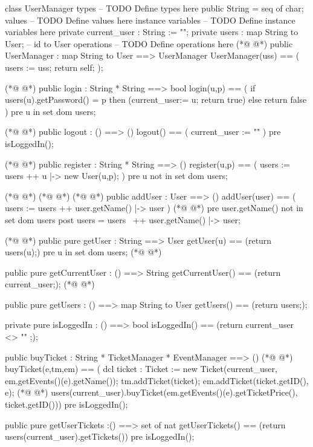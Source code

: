 \begin{vdmpp}[breaklines=true]
class UserManager
types
-- TODO Define types here
 public String = seq of char;
values
-- TODO Define values here
instance variables
-- TODO Define instance variables here
  private current_user : String := "";
 private users : map String to User; -- id to User
operations
-- TODO Define operations here
(*@
\label{UserManager:13}
@*)
 public UserManager : map String to User ==> UserManager
 UserManager(uss) == (
  users := uss;
  return self;
 );
 
(*@
\label{login:19}
@*)
 public login : String * String ==> bool
 login(u,p) == (
  if users(u).getPassword() = p
  then (current_user:= u; return true)
  else return false
 )
 pre u in set dom users;
 
(*@
\label{logout:27}
@*)
 public logout : () ==> ()
 logout() == (
  current_user := ""
 )
 pre isLoggedIn();
 
(*@
\label{register:33}
@*)
 public register : String * String ==> ()
 register(u,p) == (
  users := users ++ {u |-> new User(u,p)};
 )
 pre u not in set dom users;
 
(*@
\label{addEvent:39}
@*)
(*@
\label{getUser:39}
@*)
(*@
\label{addUser:39}
@*)
 public addUser : User ==> ()
 addUser(user) == (
  users := users ++ {user.getName() |-> user}
 )
(*@
\label{getCurrentUser:43}
@*)
 pre user.getName() not in set dom users
 post users = users~ ++ {user.getName() |-> user};
 
(*@
\label{getUsers:46}
@*)
 public pure getUser : String ==> User
 getUser(u) == (return users(u);)
 pre u in set dom users;
(*@
\label{isLoggedIn:49}
@*)

 public pure getCurrentUser : () ==> String
 getCurrentUser() == (return current_user;);
(*@
\label{buyTicket:52}
@*)
 
 public pure getUsers : () ==> map String to User
 getUsers() == (return users;);
 
 private pure isLoggedIn : () ==> bool
 isLoggedIn() == (return current_user <> "" ;);
 
 public buyTicket : String * TicketManager * EventManager ==> ()
(*@
\label{getUserTickets:60}
@*)
 buyTicket(e,tm,em) == (
 dcl ticket : Ticket := new Ticket(current_user, em.getEvents()(e).getName());
 tm.addTicket(ticket);
 em.addTicket(ticket.getID(), e);
(*@
\label{getUserTicketsEvent:64}
@*)
 users(current_user).buyTicket(em.getEvents()(e).getTicketPrice(), ticket.getID()))
 pre isLoggedIn();
 
 public pure getUserTickets :() ==> set of nat
 getUserTickets() == (return users(current_user).getTickets())
 pre isLoggedIn();
 

\end{vdmpp}
